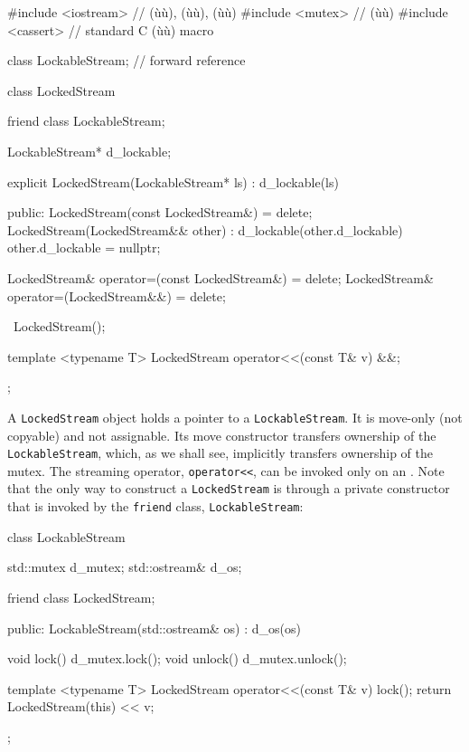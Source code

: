 \begin{emcppslisting}[emcppsbatch=e5]
#include <iostream>  // (ù{}ù), (ù{}ù), (ù{}ù)
#include <mutex>     // (ù{}ù)
#include <cassert>   // standard C (ù{}ù) macro

class LockableStream;  // forward reference

class LockedStream
{
    friend class LockableStream;

    LockableStream* d_lockable;

    explicit LockedStream(LockableStream* ls) : d_lockable(ls) { }

public:
    LockedStream(const LockedStream&) = delete;
    LockedStream(LockedStream&& other) : d_lockable(other.d_lockable)
    {
        other.d_lockable = nullptr;
    }

    LockedStream& operator=(const LockedStream&) = delete;
    LockedStream& operator=(LockedStream&&) = delete;

    ~LockedStream();

    template <typename T> LockedStream operator<<(const T& v) &&;
};
\end{emcppslisting}
    

\noindent A \lstinline!LockedStream! object holds a pointer to a
\lstinline!LockableStream!. It is move-only (not copyable) and not
assignable. Its move constructor transfers ownership of the
\lstinline!LockableStream!, which, as we shall see, implicitly transfers
ownership of the mutex. The streaming operator, \lstinline!operator<<!, can
be invoked only on an . Note that the only way to construct
a \lstinline!LockedStream! is through a private constructor that is invoked
by the \lstinline!friend! class, \lstinline!LockableStream!:

\begin{emcppslisting}[emcppsbatch=e5]
class LockableStream
{
    std::mutex    d_mutex;
    std::ostream& d_os;

    friend class LockedStream;

public:
    LockableStream(std::ostream& os) : d_os(os) { }

    void lock()   { d_mutex.lock(); }
    void unlock() { d_mutex.unlock(); }

    template <typename T> LockedStream operator<<(const T& v)
    {
        lock();
        return LockedStream(this) << v;
    }
};
\end{emcppslisting}
    

